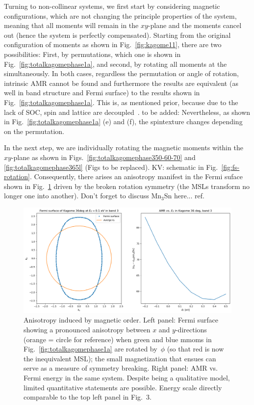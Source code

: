 \documentclass[prb,showpacs,amsmath,amssymb,superscriptaddress,twocolumn,floatfix]{revtex4-1}
\begin{document}
Turning to non-collinear systems, we
first start by considering magnetic configurations, which are not
changing the principle properties of the system, meaning that all
moments will remain in the $xy$-plane and the moments cancel out
(hence the system is perfectly compensated). Starting from the
original configuration of moments as shown in Fig.~\ref{fig:kagome11},
there are two possibilities: First, by permutations, which one is
shown in Fig.~\ref{fig:totalkagomephase1a}, and second, by rotating
all moments at the simultaneously. In both cases, regardless the
permutation or angle of rotation, intrinsic AMR cannot be found and
furthermore the results are equivalent (as well in band structure and
Fermi surface) to the results shown in
Fig.~\ref{fig:totalkagomephase1a}. This is, as mentioned prior,
because due to the lack of SOC, spin and lattice are
decoupled~\cite{Gonzalez-Hernandez:2024}. {\color{red} to be added:}
Nevertheless, as shown in Fig.~\ref{fig:totalkagomephase1a} (e) and (f), the spintexture changes depending on the permutation. 

In the next step, we are individually rotating the magnetic moments
within the $xy$-plane as shown in Figs.~\ref{fig:totalkagomephase350-60-70} and
\ref{fig:totalkagomephase365l} {\color{red} (Figs to be replaced)}.
KV: schematic in Fig.~\ref{fig:fs-rotation}.
Consequently, there arises an anisotropy manifest in the Fermi suface
shown in Fig.~\ref{fig:asymmFS} driven by the broken rotation symmetry (the MSLs
transform no longer one into another). {\color{red} Don't forget to
  discuss Mn$_3$Sn here...} ref.~\cite{Sharma:2023}

\begin{figure}
	\centering
	\includegraphics[width=0.9\linewidth]{img/fig4}
	\caption{Anisotropy induced by magnetic order. Left panel: Fermi surface showing a pronounced anisotropy between $x$ and $y$-directions (orange = circle for reference) when green and blue mmoms in Fig.~\ref{fig:totalkagomephase1a} are rotated by~$\phi$ (so that red is now the inequivalent MSL); the small magnetization that ensues can serve as a measure of symmetry breaking. Right panel: AMR vs. Fermi energy in the same system. Despite being a qualitative model, limited quantitative statements are possible.
      Energy scale directly comparable to the top left panel in Fig.~3.}
   \label{fig:asymmFS}
\end{figure}
\end{document}
